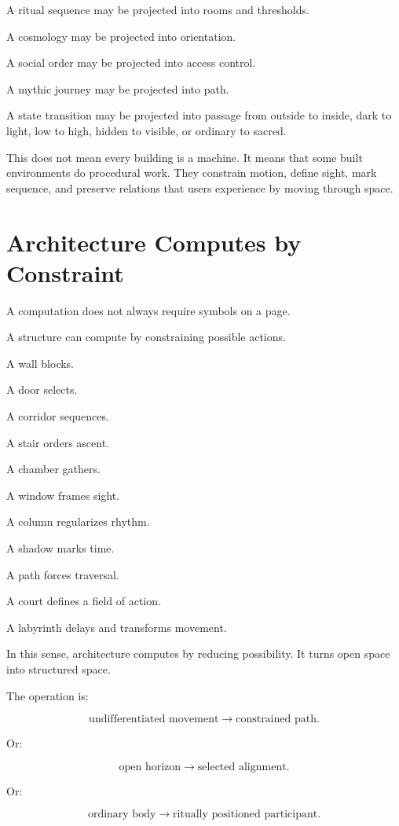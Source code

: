 \documentclass[11pt]{book}
\begin{document}
A ritual sequence may be projected into rooms and thresholds.

A cosmology may be projected into orientation.

A social order may be projected into access control.

A mythic journey may be projected into path.

A state transition may be projected into passage from outside to inside, dark to light, low to high, hidden to visible, or ordinary to sacred.

This does not mean every building is a machine. It means that some built environments do procedural work. They constrain motion, define sight, mark sequence, and preserve relations that users experience by moving through space.

\section{Architecture Computes by Constraint}

A computation does not always require symbols on a page.

A structure can compute by constraining possible actions.

A wall blocks.

A door selects.

A corridor sequences.

A stair orders ascent.

A chamber gathers.

A window frames sight.

A column regularizes rhythm.

A shadow marks time.

A path forces traversal.

A court defines a field of action.

A labyrinth delays and transforms movement.

In this sense, architecture computes by reducing possibility. It turns open space into structured space.

The operation is:

\[
\text{undifferentiated movement}
\rightarrow
\text{constrained path}.
\]

Or:

\[
\text{open horizon}
\rightarrow
\text{selected alignment}.
\]

Or:

\[
\text{ordinary body}
\rightarrow
\text{ritually positioned participant}.
\]
\end{document}
